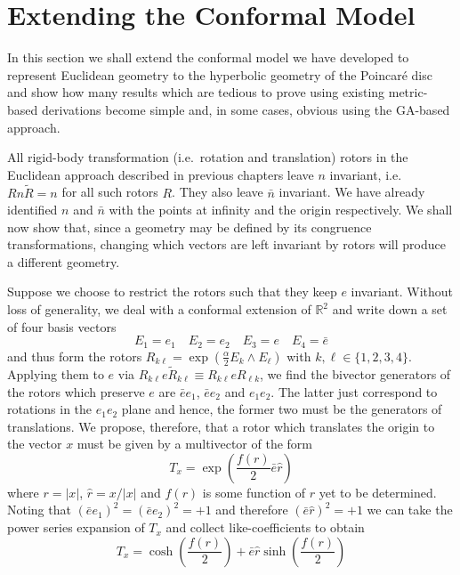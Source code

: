\section{Extending the Conformal Model}
\label{sec:extendconfmodel}

In this section we shall extend the conformal model we have developed to
represent Euclidean geometry to the hyperbolic geometry of the Poincar\'e
disc and show how many results which are tedious to prove using existing
metric-based derivations become simple and, in some cases, obvious using the
GA-based approach.

All rigid-body transformation (i.e.\ rotation and translation) rotors in 
the Euclidean approach described in previous chapters leave $n$ invariant, i.e.\ 
$Rn\tilde{R} = n$ for all such rotors $R$. They also leave $\bar{n}$ invariant. We have
already identified $n$ and $\bar{n}$ with the points at infinity and the origin 
respectively. We shall now show that, since a geometry may be defined by its 
congruence transformations, changing which vectors are left invariant by rotors
will produce a different geometry.

Suppose we choose to restrict the rotors such that they keep $e$
invariant. Without loss of generality, we deal with a conformal extension of
$\mathbb{R}^2$ and write down a set of four basis vectors
\begin{equation}
E_1 = e_1 \quad E_2 = e_2 \quad E_3 = e \quad E_4 = \bar{e}
\end{equation}
and thus form the rotors $R_{k\ell } = \exp\left(\frac{\alpha}{2}E_k \wedge E_\ell\right)$ with $k,\ell \in \{1,2,3,4\}$.
Applying them to $e$ via $R_{k\ell }e\tilde{R}_{k\ell } \equiv R_{k\ell }eR_{\ell k}$, we find
the bivector generators of the rotors which preserve $e$ are $\bar{e}e_1$, 
$\bar{e}e_2$ and $e_1e_2$. The latter just correspond to rotations in the
$e_1e_2$ plane and hence, the former two must be the generators of
translations. We propose, therefore, that a rotor which translates the origin to the vector
$x$ must be given by a multivector of the form
\begin{equation}
T_x = \exp\left(\frac{f(r)}{2}\bar{e}\hat{r}\right)
\end{equation}
where $r = |x|$, $\hat{r} = x/|x|$ and $f(r)$ is some function of $r$ yet to
be determined. Noting that $(\bar{e}{e_1})^2 = (\bar{e}e_2)^2 = +1$ and therefore
$(\bar{e}\hat{r})^2 = +1$ we can take the power series expansion of $T_x$ and
collect like-coefficients to obtain
\begin{equation}
T_x = \cosh\left(\frac{f(r)}{2}\right) + \bar{e}\hat{r}\sinh\left(\frac{f(r)}{2}\right)
\label{eqn:nonEuclidTrans1}
\end{equation}

